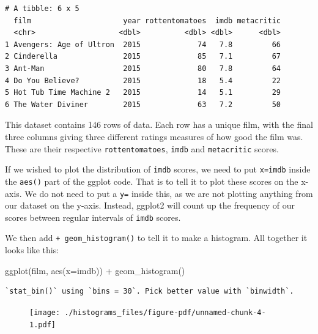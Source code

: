 \documentclass[
  letterpaper,
  DIV=11,
  numbers=noendperiod]{scrreprt}
\newenvironment{Shaded}{\begin{snugshade}}{\end{snugshade}}
\newcommand{\AttributeTok}[1]{\textcolor[rgb]{0.40,0.45,0.13}{#1}}
\newcommand{\FunctionTok}[1]{\textcolor[rgb]{0.28,0.35,0.67}{#1}}
\newcommand{\NormalTok}[1]{\textcolor[rgb]{0.00,0.23,0.31}{#1}}
\newcommand{\SpecialCharTok}[1]{\textcolor[rgb]{0.37,0.37,0.37}{#1}}
\begin{document}
\begin{verbatim}
# A tibble: 6 x 5
  film                     year rottentomatoes  imdb metacritic
  <chr>                   <dbl>          <dbl> <dbl>      <dbl>
1 Avengers: Age of Ultron  2015             74   7.8         66
2 Cinderella               2015             85   7.1         67
3 Ant-Man                  2015             80   7.8         64
4 Do You Believe?          2015             18   5.4         22
5 Hot Tub Time Machine 2   2015             14   5.1         29
6 The Water Diviner        2015             63   7.2         50
\end{verbatim}

This dataset contains 146 rows of data. Each row has a unique film, with
the final three columns giving three different ratings measures of how
good the film was. These are their respective \texttt{rottentomatoes},
\texttt{imdb} and \texttt{metacritic} scores.

If we wished to plot the distribution of \texttt{imdb} scores, we need
to put \texttt{x=imdb} inside the \texttt{aes()} part of the ggplot
code. That is to tell it to plot these scores on the x-axis. We do not
need to put a \texttt{y=} inside this, as we are not plotting anything
from our dataset on the y-axis. Instead, ggplot2 will count up the
frequency of our scores between regular intervals of \texttt{imdb}
scores.

We then add \texttt{+\ geom\_histogram()} to tell it to make a
histogram. All together it looks like this:

\begin{Shaded}
\begin{Highlighting}[]
\FunctionTok{ggplot}\NormalTok{(film, }\FunctionTok{aes}\NormalTok{(}\AttributeTok{x=}\NormalTok{imdb)) }\SpecialCharTok{+} 
  \FunctionTok{geom\_histogram}\NormalTok{()  }
\end{Highlighting}
\end{Shaded}

\begin{verbatim}
`stat_bin()` using `bins = 30`. Pick better value with `binwidth`.
\end{verbatim}

\begin{figure}[H]

{\centering \texttt{[image: ./histograms\_files/figure-pdf/unnamed-chunk-4-1.pdf]}

}

\end{figure}
\end{document}

